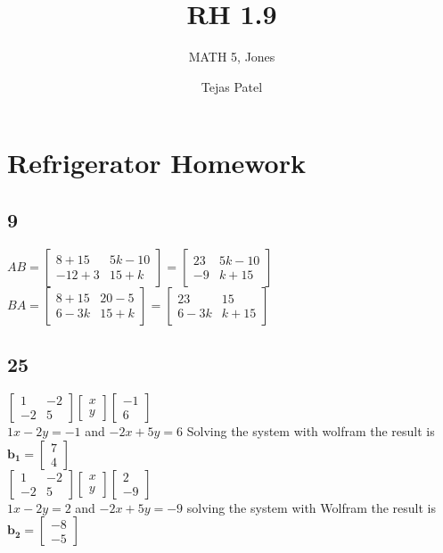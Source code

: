 \documentclass{article}
\title{RH 1.9}
\author{MATH 5, Jones}
\date{Tejas Patel}
\begin{document}
\maketitle
\section*{Refrigerator Homework}
\subsection*{9}
$AB=\begin{bmatrix}
  8+15 & 5k-10 \\ -12+3 & 15+k
\end{bmatrix}= \begin{bmatrix} 23 & 5k - 10 \\ -9 & k + 15 \end{bmatrix}$
\\[0.1in]$BA = \begin{bmatrix}8+15 & 20-5 \\ 6-3k & 15+k \end{bmatrix} = \begin{bmatrix} 23 & 15 \\ 6 - 3k & k + 15 \end{bmatrix}$
\\ 
\subsection*{25}
$\begin{bmatrix} 1 & -2 \\ -2 & 5 \end{bmatrix}\begin{bmatrix} x \\ y \end{bmatrix}\begin{bmatrix} -1 \\ 6 \end{bmatrix}$
\\[0.1in]$ 1x - 2y = -1 $ and $ -2x + 5y = 6 $ Solving the system with wolfram the result is $\mathbf{b_1} = \begin{bmatrix} 7 \\ 4 \end{bmatrix}$
\\$\begin{bmatrix} 1 & -2 \\ -2 & 5 \end{bmatrix}\begin{bmatrix} x \\ y \end{bmatrix}\begin{bmatrix} 2 \\ -9 \end{bmatrix}$
\\[0.1in]$ 1x - 2y = 2 $ and $-2x + 5y = -9 $ solving the system with Wolfram the result is $\mathbf{b_2} = \begin{bmatrix} -8 \\ -5 \end{bmatrix}$
\end{document}
